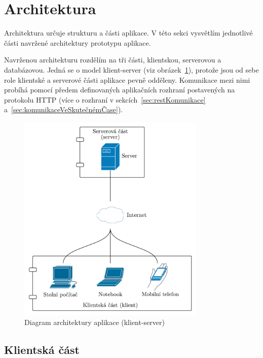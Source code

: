 
\section{Architektura}\label{sec:architektura}

Architektura určuje strukturu a části aplikace.
V této sekci vysvětlím jednotlivé části navržené architektury prototypu aplikace.

Navrženou architekturu rozdělím na tři části, klientskou, serverovou a databázovou.
Jedná se o model klient-server (viz obrázek~\ref{fig:client_server}), protože jsou od sebe role klientské a serverové části aplikace pevně odděleny.
Komunikace mezi nimi probíhá pomocí předem definovaných aplikačních rozhraní postavených na protokolu \gls{HTTP} (více o rozhraní v sekcích~\ref{sec:restKomunikace} a~\ref{sec:komunikaceVeSkutečnémČase}).

\begin{figure}[ht!]
    \centering
    \includegraphics[width=0.8\textwidth]{partials/navrh/clientServer2.pdf}
    \caption{Diagram architektury aplikace (klient-server)}\label{fig:client_server}
\end{figure}

\subsection{Klientská část}\label{subsec:klientskáČást}

